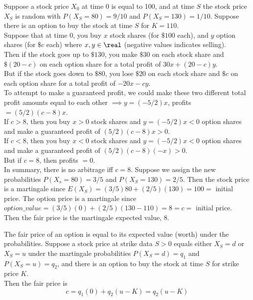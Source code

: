 \documentclass[11pt]{article}
\begin{document}
   	Suppose a stock price $X_0$ at time 0 is equal to 100, and at time $S$ the stock price $X_S$ is random with $P(X_S = 80) = 9/10$ and $P(X_S = 130) = 1/10$. Suppose there is an option to buy the stock at time $S$ for $K = 110$. \\Suppose that at time 0, you buy $x$ stock shares (for $\$100$ each), and $y$ option shares (for $\$ c$ each) where $x, y \in \real$ (negative values indicates selling).\\
   	Then if the stock goes up to $\$130$, you make $\$30$ on each stock share and $\$(20-c)$ on each option share for a total profit of $30x + (20-c) y$.\\
   	But if the stock goes down to $\$80$, you lose $\$20$ on each stock share and $\$c$ on each option share for a total profit of $-20x - cy$.\\
   	To attempt to make a guaranteed profit, we could make these two different total profit amounts equal to each other $\implies y = (-5/2)x$, profits $= (5/2)(c-8)x$.\\
   	If $c > 8$, then you buy $x > 0$ stock shares and $y = (-5/2)x < 0$ option shares and make a guaranteed profit of $(5/2)(c-8)x>0$.\\
   	If $c < 8$, then you buy $x < 0$ stock shares and $y = (-5/2)x < 0$ option shares and make a guaranteed profit of $(5/2)(c-8)(-x)>0$.\\   	
   	But if $c=8$, then profits $=0$.\\
   	In summary, there is no arbitrage iff $c = 8$.
   	\example
   	Suppose we assign the new probabilities $P(X_s = 80) = 3/5$ and $P(X_S = 130) = 2/5$. Then the stock price is a martingale since $E(X_S) = (3/5)80 + (2/5)(130) = 100 = $ initial price. The option price is a martingale since $option\_value = (3/5)(0) + (2/5)(130 - 110) = 8 = c = $ initial price.  \\
   	Then the fair price is the martingale expected value, 8. 
    
    
     The fair price of an option is equal to its expected value (worth) under the  probabilities.
    \example
    Suppose a stock price at strike data $S > 0$ equals either $X_S = d$ or $X_S = u$ under the martingale probabilities $P(X_S = d) = q_1$ and $P(X_S = u) = q_2$, and there is an option to buy the stock at time $S$ for strike price $K$. \\
    Then the fair price is 
    $$c = q_1(0) + q_2(u - K) = q_2(u-K)$$
    
\end{document}
